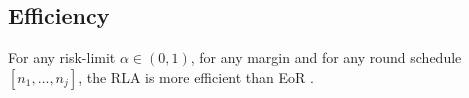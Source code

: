 % 





% 

\subsection{Efficiency}
\begin{lemma}
For any risk-limit $\alpha \in (0, 1)$, for any margin
and for any round schedule $[n_1, \ldots, n_j]$, 
the \Providence RLA is more efficient than EoR \BRAVO.
\end{lemma}

